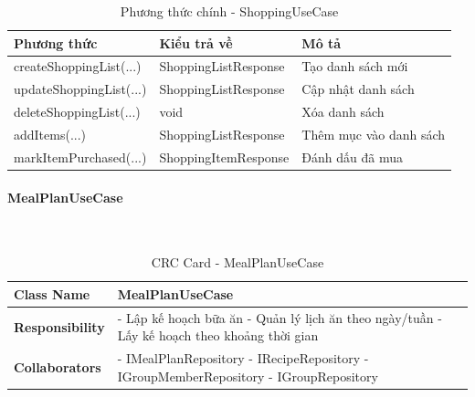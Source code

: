 \begin{table}[H]
\small
\renewcommand{\arraystretch}{1.3}
\begin{tabularx}{\textwidth}{|>{\raggedright\arraybackslash}p{5cm}|>{\raggedright\arraybackslash}p{3.5cm}|X|}
\hline
\rowcolor{gray!20}
\textbf{Phương thức} & \textbf{Kiểu trả về} & \textbf{Mô tả} \\
\hline
createShoppingList(...) & ShoppingListResponse & Tạo danh sách mới \\
\hline
updateShoppingList(...) & ShoppingListResponse & Cập nhật danh sách \\
\hline
deleteShoppingList(...) & void & Xóa danh sách \\
\hline
addItems(...) & ShoppingListResponse & Thêm mục vào danh sách \\
\hline
markItemPurchased(...) & ShoppingItemResponse & Đánh dấu đã mua \\
\hline
\end{tabularx}
\caption{Phương thức chính - ShoppingUseCase}
\end{table}

\paragraph{MealPlanUseCase} ~\\

\begin{table}[H]
\small
\renewcommand{\arraystretch}{1.3}
\begin{tabularx}{\textwidth}{|>{\raggedright\arraybackslash}p{3.5cm}|X|}
\hline
\rowcolor{gray!20}
\textbf{Class Name} & MealPlanUseCase \\
\hline
\textbf{Responsibility} & - Lập kế hoạch bữa ăn \newline - Quản lý lịch ăn theo ngày/tuần \newline - Lấy kế hoạch theo khoảng thời gian \\
\hline
\textbf{Collaborators} & - IMealPlanRepository \newline - IRecipeRepository \newline - IGroupMemberRepository \newline - IGroupRepository \\
\hline
\end{tabularx}
\caption{CRC Card - MealPlanUseCase}
\end{table}


